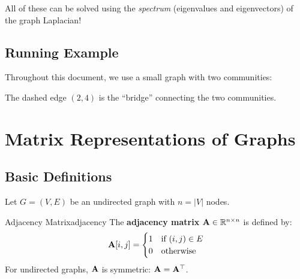 \begin{notechapter}
All of these can be solved using the \emph{spectrum} (eigenvalues and eigenvectors) of the graph Laplacian!

\subsection{Running Example}

Throughout this document, we use a small graph with two communities:

\begin{center}
\end{center}

The dashed edge $(2,4)$ is the ``bridge'' connecting the two communities.

\section{Matrix Representations of Graphs}

\subsection{Basic Definitions}

Let $G = (V, E)$ be an undirected graph with $n = |V|$ nodes.

\begin{definition}{Adjacency Matrix}{adjacency}
The \textbf{adjacency matrix} $\mathbf{A} \in \mathbb{R}^{n \times n}$ is defined by:
\[
\mathbf{A}[i,j] = \begin{cases} 1 & \text{if } (i,j) \in E \\ 0 & \text{otherwise} \end{cases}
\]
For undirected graphs, $\mathbf{A}$ is symmetric: $\mathbf{A} = \mathbf{A}^\top$.
\end{definition}


\end{notechapter}
